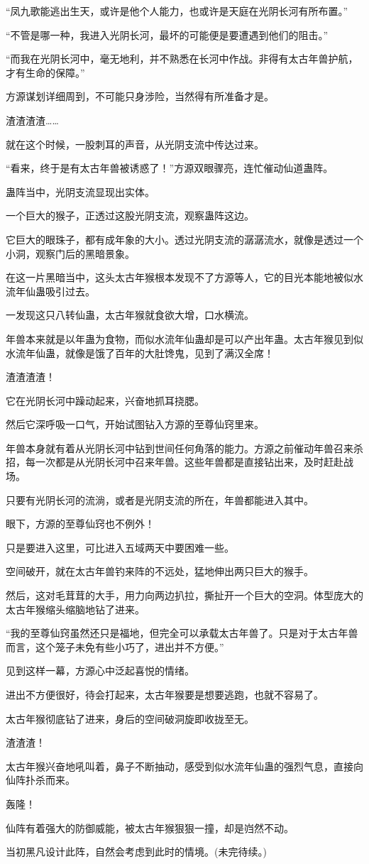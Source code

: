 \begin{this_body}
“凤九歌能逃出生天，或许是他个人能力，也或许是天庭在光阴长河有所布置。”

“不管是哪一种，我进入光阴长河，最坏的可能便是要遭遇到他们的阻击。”

“而我在光阴长河中，毫无地利，并不熟悉在长河中作战。非得有太古年兽护航，才有生命的保障。”

方源谋划详细周到，不可能只身涉险，当然得有所准备才是。

渣渣渣渣……

就在这个时候，一股刺耳的声音，从光阴支流中传达过来。

“看来，终于是有太古年兽被诱惑了！”方源双眼骤亮，连忙催动仙道蛊阵。

蛊阵当中，光阴支流显现出实体。

一个巨大的猴子，正透过这股光阴支流，观察蛊阵这边。

它巨大的眼珠子，都有成年象的大小。透过光阴支流的潺潺流水，就像是透过一个小洞，观察门后的黑暗景象。

在这一片黑暗当中，这头太古年猴根本发现不了方源等人，它的目光本能地被似水流年仙蛊吸引过去。

一发现这只八转仙蛊，太古年猴就食欲大增，口水横流。

年兽本来就是以年蛊为食物，而似水流年仙蛊却是可以产出年蛊。太古年猴见到似水流年仙蛊，就像是饿了百年的大肚馋鬼，见到了满汉全席！

渣渣渣渣！

它在光阴长河中躁动起来，兴奋地抓耳挠腮。

然后它深呼吸一口气，开始试图钻入方源的至尊仙窍里来。

年兽本身就有着从光阴长河中钻到世间任何角落的能力。方源之前催动年兽召来杀招，每一次都是从光阴长河中召来年兽。这些年兽都是直接钻出来，及时赶赴战场。

只要有光阴长河的流淌，或者是光阴支流的所在，年兽都能进入其中。

眼下，方源的至尊仙窍也不例外！

只是要进入这里，可比进入五域两天中要困难一些。

空间破开，就在太古年兽钓来阵的不远处，猛地伸出两只巨大的猴手。

然后，这对毛茸茸的大手，用力向两边扒拉，撕扯开一个巨大的空洞。体型庞大的太古年猴缩头缩脑地钻了进来。

“我的至尊仙窍虽然还只是福地，但完全可以承载太古年兽了。只是对于太古年兽而言，这个笼子未免有些小巧了，进出并不方便。”

见到这样一幕，方源心中泛起喜悦的情绪。

进出不方便很好，待会打起来，太古年猴要是想要逃跑，也就不容易了。

太古年猴彻底钻了进来，身后的空间破洞旋即收拢至无。

渣渣渣！

太古年猴兴奋地吼叫着，鼻子不断抽动，感受到似水流年仙蛊的强烈气息，直接向仙阵扑杀而来。

轰隆！

仙阵有着强大的防御威能，被太古年猴狠狠一撞，却是岿然不动。

当初黑凡设计此阵，自然会考虑到此时的情境。(未完待续。)

\end{this_body}

